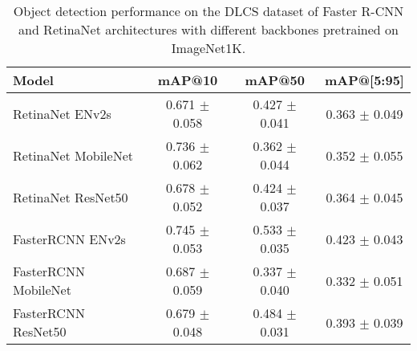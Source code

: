\begin{table}[h]
    \centering
    \begin{tabular}{lccc}
        \hline
        \textbf{Model} & \textbf{mAP@10} & \textbf{mAP@50} & \textbf{mAP@[5:95]} \\
        \hline
        RetinaNet ENv2s      & 0.671 $\pm$ 0.058 & 0.427 $\pm$ 0.041 & 0.363 $\pm$ 0.049 \\
        RetinaNet MobileNet  & 0.736 $\pm$ 0.062 & 0.362 $\pm$ 0.044 & 0.352 $\pm$ 0.055 \\
        RetinaNet ResNet50   & 0.678 $\pm$ 0.052 & 0.424 $\pm$ 0.037 & 0.364 $\pm$ 0.045 \\
        \rowcolor{yellow!20} 
        FasterRCNN ENv2s     & 0.745 $\pm$ 0.053 & 0.533 $\pm$ 0.035 & 0.423 $\pm$ 0.043 \\
        FasterRCNN MobileNet & 0.687 $\pm$ 0.059 & 0.337 $\pm$ 0.040 & 0.332 $\pm$ 0.051 \\
        FasterRCNN ResNet50  & 0.679 $\pm$ 0.048 & 0.484 $\pm$ 0.031 & 0.393 $\pm$ 0.039 \\
        \hline
    \end{tabular}
    \caption{Object detection performance on the DLCS dataset of Faster R-CNN and RetinaNet architectures with different backbones pretrained on ImageNet1K.}
    \label{tab:dlcs-models-not-pretrained}
\end{table}